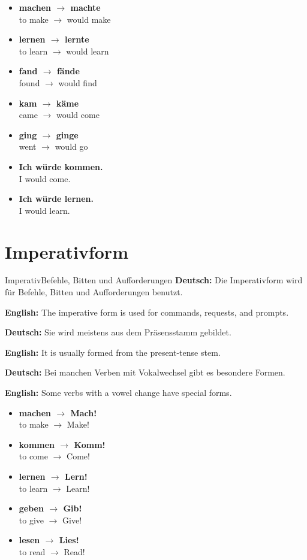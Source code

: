 \documentclass[a4paper,11pt]{article}
\newcommand{\GermanText}[1]{\textbf{Deutsch: }#1\par}
\newcommand{\EnglishText}[1]{{\small\color{SoftGray}\textbf{English: }#1\par}}
\newcommand{\ExampleItem}[2]{\item \textbf{#1}\\{\small\color{SoftGray}#2}}
\begin{document}
        \begin{exbox}
            \begin{itemize}
                \ExampleItem{machen $\rightarrow$ machte}{to make $\rightarrow$ would make}
                \ExampleItem{lernen $\rightarrow$ lernte}{to learn $\rightarrow$ would learn}
                \ExampleItem{fand $\rightarrow$ fände}{found $\rightarrow$ would find}
                \ExampleItem{kam $\rightarrow$ käme}{came $\rightarrow$ would come}
                \ExampleItem{ging $\rightarrow$ ginge}{went $\rightarrow$ would go}
                \ExampleItem{Ich würde kommen.}{I would come.}
                \ExampleItem{Ich würde lernen.}{I would learn.}
            \end{itemize}
        \end{exbox}

    \section{Imperativform}

        \begin{grammarentry}{Imperativ}{Befehle, Bitten und Aufforderungen}
            \GermanText{Die Imperativform wird für Befehle, Bitten und Aufforderungen benutzt.}
            \EnglishText{The imperative form is used for commands, requests, and prompts.}

            \GermanText{Sie wird meistens aus dem Präsensstamm gebildet.}
            \EnglishText{It is usually formed from the present-tense stem.}

            \GermanText{Bei manchen Verben mit Vokalwechsel gibt es besondere Formen.}
            \EnglishText{Some verbs with a vowel change have special forms.}
        \end{grammarentry}

        \begin{exbox}
            \begin{itemize}
                \ExampleItem{machen $\rightarrow$ Mach!}{to make $\rightarrow$ Make!}
                \ExampleItem{kommen $\rightarrow$ Komm!}{to come $\rightarrow$ Come!}
                \ExampleItem{lernen $\rightarrow$ Lern!}{to learn $\rightarrow$ Learn!}
                \ExampleItem{geben $\rightarrow$ Gib!}{to give $\rightarrow$ Give!}
                \ExampleItem{lesen $\rightarrow$ Lies!}{to read $\rightarrow$ Read!}
            \end{itemize}
        \end{exbox}
\end{document}
